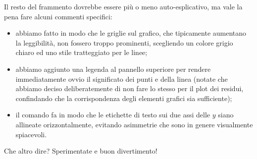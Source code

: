 Il resto del frammento dovrebbe essere più o meno auto-esplicativo, ma vale la
pena fare alcuni commenti specifici:
\begin{itemize}
  \item abbiamo fatto in modo che le griglie sul grafico, che tipicamente aumentano
    la leggibilità, non fossero troppo prominenti, scegliendo un colore grigio
    chiaro ed uno stile tratteggiato per le linee;
  \item abbiamo aggiunto una legenda al pannello superiore per rendere
    immediatamente ovvio il significato dei punti e della linea (notate che
    abbiamo deciso deliberatemente di non fare lo stesso per il plot dei residui,
    confindando che la corrispondenza degli elementi grafici sia sufficiente);
  \item il comando  fa in modo che
    le etichette di testo sui due assi delle $y$ siano allineate orizzontalmente,
    evitando asimmetrie che sono in genere visualmente spiacevoli.
\end{itemize}

\noindent Che altro dire? Sperimentate e buon divertimento!
